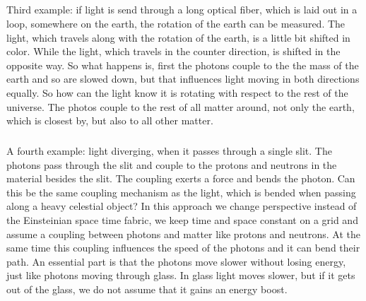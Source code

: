 \subparagraph{}
Third example: if light is send through a long optical fiber, which is laid out in a loop, somewhere on the earth, the rotation of the earth can be measured. The light, which travels along with the rotation of the earth, is a little bit shifted in color. While the light, which travels in the counter direction, is shifted in the opposite way. So what happens is, first the photons couple to the the mass of the earth and so are slowed down, but that influences light moving in both directions equally. So how can the light know it is rotating with respect to the rest of the universe. The photos couple to the rest of all matter around, not only the earth, which is closest by, but also to all other matter.
\subparagraph{}
A fourth example: light diverging, when it passes through a single slit. The photons pass through the slit and couple to the protons and neutrons in the material besides the slit. The coupling exerts a force and bends the photon. Can this be the same coupling mechanism as the light, which is bended when passing along a heavy celestial object?
In this approach we change perspective instead of the Einsteinian space time fabric, we keep time and space constant on a grid and assume a coupling between photons and matter like protons and neutrons. At the same time this coupling influences the speed of the photons and it can bend their path.
An essential part is that the photons move slower without losing energy, just like photons moving through glass. In glass light moves slower, but if it gets out of the glass, we do not assume that it gains an energy boost.


